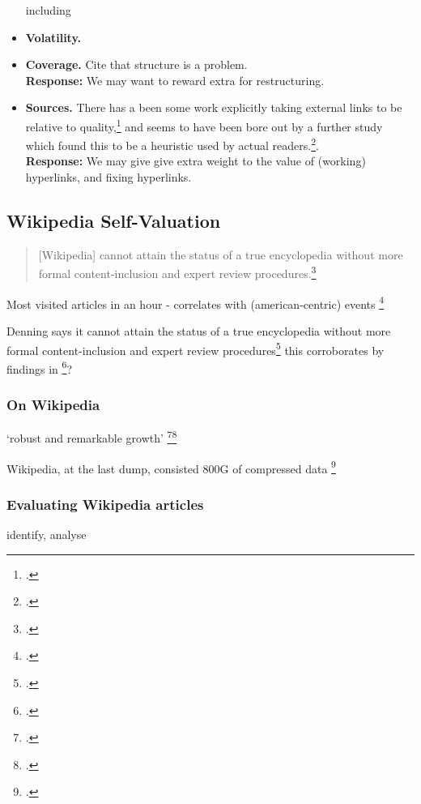 \documentclass[a4paper,11pt,twoside,notitlepage]{article}
\renewcommand{\cite}[1]{\footcite{#1}}
\begin{document}
\begin{itemize}
            including 
          \item \textbf{Volatility.} 
          \item \textbf{Coverage.} Cite that structure is a
            problem.\\
            \textbf{Response:} We may want to reward extra for restructuring.
          \item \textbf{Sources.} There has a been some work
            explicitly taking external links to be relative to
            quality,\cite{CITEHYPERLINKS} and seems to have been bore
            out by a further study which found this to be a heuristic
            used by actual readers.\cite{THISHEURISTICIGUESS}.\\
            \textbf{Response:} We may give give extra weight to the value
            of (working) hyperlinks, and fixing hyperlinks.
        \end{itemize}
            
        \subsection{Wikipedia Self-Valuation}
        \begin{quote}
          [Wikipedia] cannot attain the status of a true encyclopedia
          without more formal content-inclusion and expert review
          procedures.\cite{Denning2005}
        \end{quote}

        

        Most visited articles in an hour - correlates with
        (american-centric) events \cite{wiki-visits}

        Denning says it cannot attain the status of a true
        encyclopedia without more formal content-inclusion and expert
        review procedures\cite{Denning2005} this corroborates by
        findings in \cite{Giles2005}?

        \subsubsection{On Wikipedia}
        `robust and remarkable growth'
        \cite{Kittur2007}\cite{Voss2005} 
        
        Wikipedia, at the last dump, consisted 800G of compressed data
        \cite{wiki-dump}

        \subsubsection{Evaluating Wikipedia articles}
        identify, analyse
\end{document}
